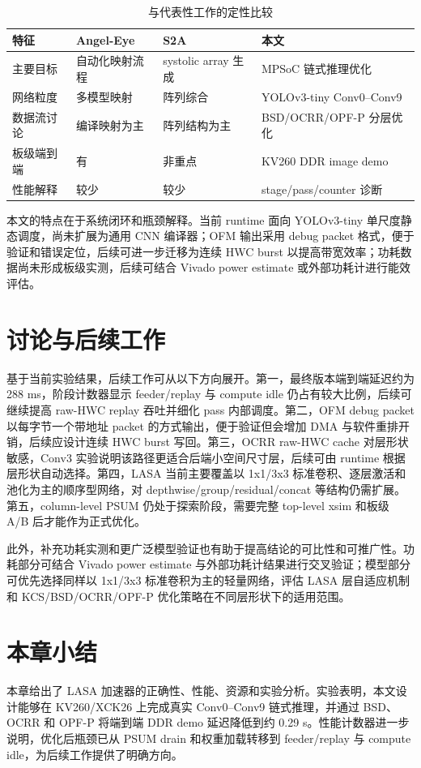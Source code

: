 \begin{table}[htb]
\centering
\caption{与代表性工作的定性比较}
\label{tab:qualitative_compare}
\begin{tabular}{p{}p{}p{}p{}}
\toprule
特征 & Angel-Eye~\cite{guo2019angeleye} & S2A~\cite{wei2017s2a} & 本文 \\
\midrule
主要目标 & 自动化映射流程 & systolic array 生成 & MPSoC 链式推理优化 \\
网络粒度 & 多模型映射 & 阵列综合 & YOLOv3-tiny Conv0--Conv9 \\
数据流讨论 & 编译映射为主 & 阵列结构为主 & BSD/OCRR/OPF-P 分层优化 \\
板级端到端 & 有 & 非重点 & KV260 DDR image demo \\
性能解释 & 较少 & 较少 & stage/pass/counter 诊断 \\
\bottomrule
\end{tabular}
\end{table}

本文的特点在于系统闭环和瓶颈解释。当前 runtime 面向 YOLOv3-tiny 单尺度静态调度，尚未扩展为通用 CNN 编译器；OFM 输出采用 debug packet 格式，便于验证和错误定位，后续可进一步迁移为连续 HWC burst 以提高带宽效率；功耗数据尚未形成板级实测，后续可结合 Vivado power estimate 或外部功耗计进行能效评估。

\section{讨论与后续工作}

基于当前实验结果，后续工作可从以下方向展开。第一，最终版本端到端延迟约为 288 ms，阶段计数器显示 feeder/replay 与 compute idle 仍占有较大比例，后续可继续提高 raw-HWC replay 吞吐并细化 pass 内部调度。第二，OFM debug packet 以每字节一个带地址 packet 的方式输出，便于验证但会增加 DMA 与软件重排开销，后续应设计连续 HWC burst 写回。第三，OCRR raw-HWC cache 对层形状敏感，Conv3 实验说明该路径更适合后端小空间尺寸层，后续可由 runtime 根据层形状自动选择。第四，LASA 当前主要覆盖以 1x1/3x3 标准卷积、逐层激活和池化为主的顺序型网络，对 depthwise/group/residual/concat 等结构仍需扩展。第五，column-level PSUM 仍处于探索阶段，需要完整 top-level xsim 和板级 A/B 后才能作为正式优化。

此外，补充功耗实测和更广泛模型验证也有助于提高结论的可比性和可推广性。功耗部分可结合 Vivado power estimate 与外部功耗计结果进行交叉验证；模型部分可优先选择同样以 1x1/3x3 标准卷积为主的轻量网络，评估 LASA 层自适应机制和 KCS/BSD/OCRR/OPF-P 优化策略在不同层形状下的适用范围。

\section{本章小结}

本章给出了 LASA 加速器的正确性、性能、资源和实验分析。实验表明，本文设计能够在 KV260/XCK26 上完成真实 Conv0--Conv9 链式推理，并通过 BSD、OCRR 和 OPF-P 将端到端 DDR demo 延迟降低到约 0.29 s。性能计数器进一步说明，优化后瓶颈已从 PSUM drain 和权重加载转移到 feeder/replay 与 compute idle，为后续工作提供了明确方向。
